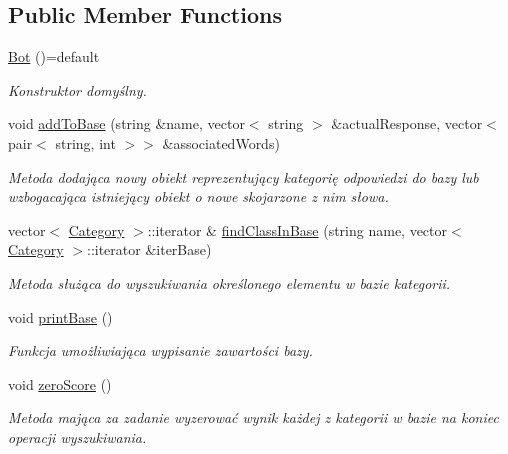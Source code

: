 \subsection*{Public Member Functions}
\begin{DoxyCompactItemize}
\item 
\mbox{\label{class_bot_acb9b548aa6e08f45ed1d99a7093fac41}} 
\mbox{\hyperlink{class_bot_acb9b548aa6e08f45ed1d99a7093fac41}{Bot}} ()=default
\begin{DoxyCompactList}\small\item\em Konstruktor domyślny. \end{DoxyCompactList}\item 
void \mbox{\hyperlink{class_bot_adc90e9f8e85c06332324ccf3fb851cca}{add\+To\+Base}} (string \&name, vector$<$ string $>$ \&actual\+Response, vector$<$ pair$<$ string, int $>$$>$ \&associated\+Words)
\begin{DoxyCompactList}\small\item\em Metoda dodająca nowy obiekt reprezentujący kategorię odpowiedzi do bazy lub wzbogacająca istniejący obiekt o nowe skojarzone z nim słowa. \end{DoxyCompactList}\item 
vector$<$ \mbox{\hyperlink{class_category}{Category}} $>$\+::iterator \& \mbox{\hyperlink{class_bot_a6c542b51a3b65415f696a0b60cf877d8}{find\+Class\+In\+Base}} (string name, vector$<$ \mbox{\hyperlink{class_category}{Category}} $>$\+::iterator \&iter\+Base)
\begin{DoxyCompactList}\small\item\em Metoda służąca do wyszukiwania określonego elementu w bazie kategorii. \end{DoxyCompactList}\item 
\mbox{\label{class_bot_a0647d3331513b34b7a0bf228a0238e26}} 
void \mbox{\hyperlink{class_bot_a0647d3331513b34b7a0bf228a0238e26}{print\+Base}} ()
\begin{DoxyCompactList}\small\item\em Funkcja umożliwiająca wypisanie zawartości bazy. \end{DoxyCompactList}\item 
\mbox{\label{class_bot_aadccbd3061df17c9aea8c7a0db17bebf}} 
void \mbox{\hyperlink{class_bot_aadccbd3061df17c9aea8c7a0db17bebf}{zero\+Score}} ()
\begin{DoxyCompactList}\small\item\em Metoda mająca za zadanie wyzerować wynik każdej z kategorii w bazie na koniec operacji wyszukiwania. \end{DoxyCompactList}\item 
$$
\end{DoxyCompactItemize}
